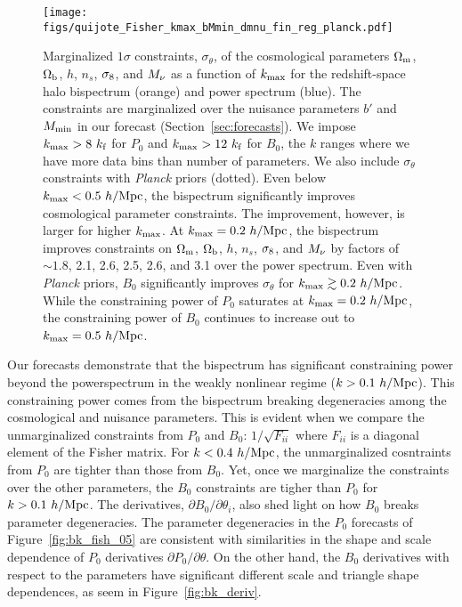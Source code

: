 \begin{figure}
\begin{center}
    \texttt{[image: figs/quijote\_Fisher\_kmax\_bMmin\_dmnu\_fin\_reg\_planck.pdf]} 
    \caption{Marginalized $1\sigma$ constraints, $\sigma_\theta$, of the cosmological 
    parameters $\Omega_{\rm m}$, $\Omega_{\rm b}$, $h$, $n_s$, $\sigma_8$, and $M_\nu$ as a function 
    of $k_{\rm max}$ for the redshift-space halo bispectrum (orange) and power 
    spectrum (blue). The constraints are marginalized over the nuisance parameters 
    $b'$ and $M_{\rm min}$ in our forecast (Section~\ref{sec:forecasts}). We impose 
    $k_{\rm max} > 8~k_{\rm f}$ for $P_0$ and $k_{\rm max} > 12~k_{\rm f}$ 
    for $B_0$, the $k$ ranges where we have more data bins than number of parameters. 
    We also include $\sigma_\theta$ constraints with {\em Planck} priors (dotted). 
    Even below $k_{\rm max} < 0.5~h/{\rm Mpc}$, the bispectrum significantly 
    improves cosmological parameter constraints. The improvement, however, is larger 
    for higher $k_{\rm max}$. At $k_{\rm max} = 0.2~h/{\rm Mpc}$, the bispectrum 
    improves constraints on $\Omega_{\rm m}$, $\Omega_{\rm b}$, $h$, $n_s$, $\sigma_8$, and $M_\nu$ by factors 
    of $\sim 1.8$, 2.1, 2.6, 2.5, 2.6, and 3.1 over the power spectrum. Even with {\em Planck}
    priors, $B_0$ significantly improves $\sigma_\theta$ for $k_{\rm max} \gtrsim 0.2~h/{\rm Mpc}$. 
    While the constraining power of $P_0$ saturates at $k_{\rm max} = 0.2~h/{\rm Mpc}$,
    the constraining power of $B_0$ continues to increase out to $k_{\rm max} = 0.5~h/{\rm Mpc}$.}
\label{fig:fish_kmax}
\end{center}
\end{figure}
Our forecasts demonstrate that the bispectrum has significant constraining power 
beyond the powerspectrum in the weakly nonlinear regime ($k > 0.1~h/{\rm Mpc}$). 
This constraining power 
comes from the bispectrum breaking degeneracies among the cosmological and 
nuisance parameters. This is evident when we compare the unmarginalized 
constraints from $P_0$ and $B_0$: $1/\sqrt{F_{ii}}$ where $F_{ii}$ is a 
diagonal element of the Fisher matrix. For $k < 0.4~h/{\rm Mpc}$, the unmarginalized 
cosntraints from $P_0$ are tighter than those from $B_0$. Yet, once we 
marginalize the constraints over the other parameters, the $B_0$ constraints 
are tigher than $P_0$ for $k > 0.1~h/{\rm Mpc}$. The derivatives, 
$\partial B_0/\partial \theta_i$, also shed light on how $B_0$ breaks parameter 
degeneracies. The parameter degeneracies in the $P_0$ forecasts of Figure~\ref{fig:bk_fish_05} 
are consistent with similarities in the shape and scale dependence of 
$P_0$ derivatives $\partial P_0/\partial \theta$. On the other hand, the 
$B_0$ derivatives with respect to the parameters have significant different 
scale and triangle shape dependences, as seem in Figure~\ref{fig:bk_deriv}.

